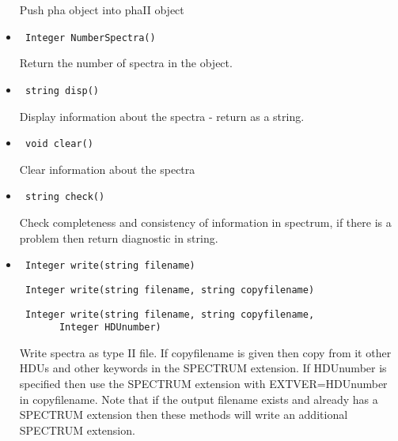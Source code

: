 \documentclass[11pt]{book}
\begin{document}
\begin{itemize}
           Push pha object into phaII object

\item  \begin{verbatim} Integer NumberSpectra() \end{verbatim}

           Return the number of spectra in the object.

\item    \begin{verbatim} string disp() \end{verbatim}

           Display information about the spectra - return as a string.

\item    \begin{verbatim} void clear() \end{verbatim}

           Clear information about the spectra

\item    \begin{verbatim} string check() \end{verbatim}

           Check completeness and consistency of information in spectrum,
           if there is a problem then return diagnostic in string.

\item  \begin{verbatim} Integer write(string filename) \end{verbatim}
       \begin{verbatim} Integer write(string filename, string copyfilename) \end{verbatim}
       \begin{verbatim} Integer write(string filename, string copyfilename,
       Integer HDUnumber) \end{verbatim}

          Write spectra as type II file. If copyfilename is given then
          copy from it other HDUs and other keywords in the SPECTRUM
          extension. If HDUnumber is specified then use the SPECTRUM
          extension with EXTVER=HDUnumber in copyfilename. Note that 
          if the output filename exists and already has a SPECTRUM 
          extension then these methods will write an additional 
          SPECTRUM extension.

\end{itemize}
\end{document}
